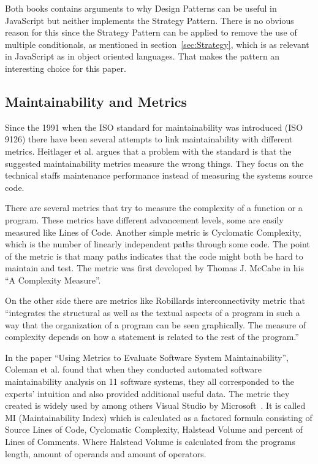 \documentclass[conference, a4paper]{IEEEtran}
\begin{document}
Both books contains arguments to why Design Patterns can be useful in JavaScript but neither implements the Strategy Pattern. There is no obvious reason for this since the Strategy Pattern can be applied to remove the use of multiple conditionals, as mentioned in section~\ref{sec:Strategy}, which is as relevant in JavaScript as in object oriented languages. That makes the pattern an interesting choice for this paper.

\subsection{Maintainability and Metrics}
\label{sec:Maintainability}

Since the 1991 when the ISO standard for maintainability was introduced (ISO 9126) there have been several attempts to link maintainability with different metrics. Heitlager et al. argues that a problem with the standard is that the suggested maintainability metrics measure the wrong things. They focus on the technical staffs maintenance performance instead of measuring the systems source code.~\cite{bibitem:Maintainability}

There are several metrics that try to measure the complexity of a function or a program. These metrics have different advancement levels, some are easily measured like Lines of Code. Another simple metric is Cyclomatic Complexity, which is the number of linearly independent paths through some code. The point of the metric is that many paths indicates that the code might both be hard to maintain and test. The metric was first developed by Thomas J. McCabe in his ``A Complexity Measure''.~\cite{bibitem:CC}

On the other side there are metrics like Robillards interconnectivity metric that ``integrates the structural as well as the textual aspects of a program in such a way that the organization of a program can be seen graphically. The measure of complexity depends on how a statement is related to the rest of the program.''~\cite{bibitem:Robillard}

In the paper ``Using Metrics to Evaluate Software System Maintainability'', Coleman et al. found that when they conducted automated software maintainability analysis on 11 software systems, they all corresponded to the experts' intuition and also provided additional useful data. The metric they created is widely used by among others Visual Studio by Microsoft~\cite{bibitem:MI}. It is called MI (Maintainability Index) which is calculated as a factored formula consisting of Source Lines of Code, Cyclomatic Complexity, Halstead Volume and percent of Lines of Comments. Where Halstead Volume is calculated from the programs length, amount of operands and amount of operators.~\cite{bibitem:MetricsToEvaluate}
\end{document}
